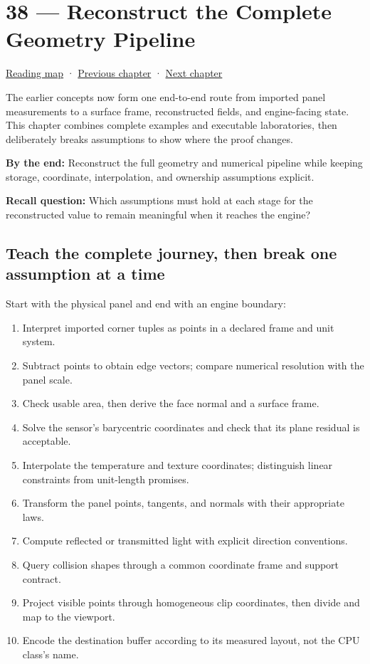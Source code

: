 \hypertarget{02-foundations-ii-ch038}{}
\section{38 --- Reconstruct the Complete Geometry Pipeline}\label{reconstruct-the-complete-geometry-pipeline}

\href{Chapter\%20Edition/01\%20-\%20Computing\%20Foundations/00\%20-\%20Reading\%20Map}{Reading map} · \hyperref[02-foundations-ii-ch037]{Previous chapter} · \hyperref[02-foundations-ii-ch039]{Next chapter}

The earlier concepts now form one end-to-end route from imported panel measurements to a surface frame, reconstructed fields, and engine-facing state. This chapter combines complete examples and executable laboratories, then deliberately breaks assumptions to show where the proof changes.

\textbf{By the end:} Reconstruct the full geometry and numerical pipeline while keeping storage, coordinate, interpolation, and ownership assumptions explicit.

\textbf{Recall question:} Which assumptions must hold at each stage for the reconstructed value to remain meaningful when it reaches the engine?

\subsection{Teach the complete journey, then break one assumption at a time}\label{teach-the-complete-journey-then-break-one-assumption-at-a-time}

Start with the physical panel and end with an engine boundary:

\begin{enumerate}
\def\labelenumi{\arabic{enumi}.}
\tightlist
\item
  Interpret imported corner tuples as points in a declared frame and unit system.
\item
  Subtract points to obtain edge vectors; compare numerical resolution with the panel scale.
\item
  Check usable area, then derive the face normal and a surface frame.
\item
  Solve the sensor's barycentric coordinates and check that its plane residual is acceptable.
\item
  Interpolate the temperature and texture coordinates; distinguish linear constraints from unit-length promises.
\item
  Transform the panel points, tangents, and normals with their appropriate laws.
\item
  Compute reflected or transmitted light with explicit direction conventions.
\item
  Query collision shapes through a common coordinate frame and support contract.
\item
  Project visible points through homogeneous clip coordinates, then divide and map to the viewport.
\item
  Encode the destination buffer according to its measured layout, not the CPU class's name.
\end{enumerate}

